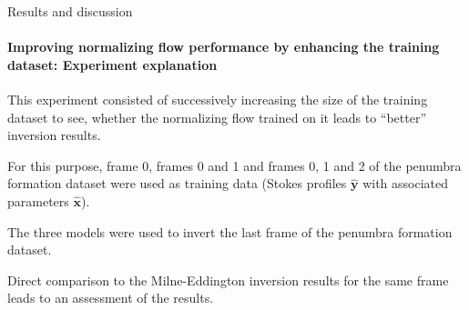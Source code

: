 \documentclass{beamer}
\newcommand\matr[1]{\ensuremath{\boldsymbol{\mathbf{#1}}}}
\begin{document}
\begin{frame}[allowframebreaks]{Results and discussion}
\framesubtitle{Improving normalizing flow performance by enhancing the training dataset: Experiment explanation} %
This experiment consisted of successively increasing the size of the training dataset to see, whether the normalizing flow trained on it leads to ``better'' inversion results.

For this purpose, frame 0, frames 0 and 1 and frames 0, 1 and 2 of the penumbra formation dataset were used as training data (Stokes profiles $\hat{\matr{y}}$ with associated parameters $\hat{\matr{x}}$).

The three models were used to invert the last frame of the penumbra formation dataset.

Direct comparison to the Milne-Eddington inversion results for the same frame leads to an assessment of the results.
\end{frame}
\end{document}
